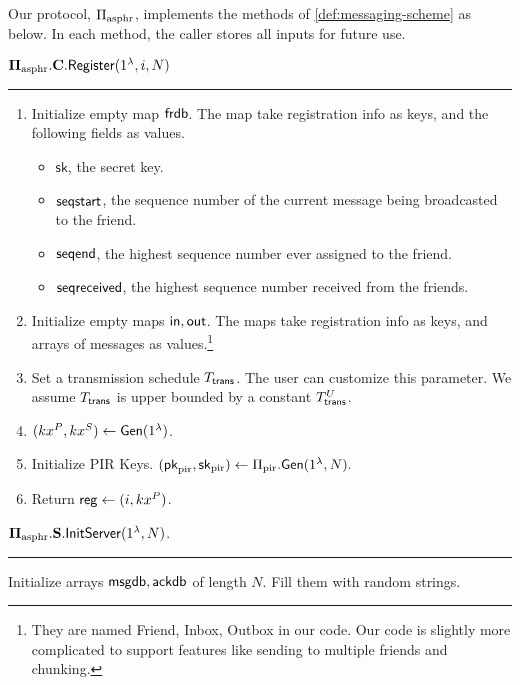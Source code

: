 \begin{definition}
Our protocol, $\Pi_{\text{asphr}}$, implements the methods of \cref{def:messaging-scheme} as below. In each method, the caller stores all inputs for future use.
\vspace{10pt}

$\mathbf{\Pi_{\text{asphr}}.C.\mathsf{Register}}(1^{\lambda}, i, N)$
\vspace{5pt}
\hrule
\vspace{5pt}
\begin{enumerate}
    \item Initialize empty map $\mathsf{frdb}$. The map take registration info as keys, and the following fields as values.
    \begin{itemize}
        \item $\mathsf{sk}$, the secret key.
        \item $\mathsf{seqstart}$, the sequence number of the current message being broadcasted to the friend.
        \item $\mathsf{seqend}$, the highest sequence number ever assigned to the friend.
        \item $\mathsf{seqreceived}$, the highest sequence number received from the friends.
    \end{itemize}
    \item Initialize empty maps $\mathsf{in}, \mathsf{out}$. The maps take registration info as keys, and arrays of messages as values.\footnote{They are named Friend, Inbox, Outbox in our code. Our code is slightly more complicated to support features like sending to multiple friends and chunking.}
    \item Set a transmission schedule $T_{\mathsf{trans}}$. The user can customize this parameter. We assume $T_{\mathsf{trans}}$ is upper bounded by a constant $T_{\mathsf{trans}}^U$.
    \item $(kx^P, kx^S) \leftarrow \mathsf{Gen}(1^{\lambda})$. 
    \item Initialize PIR Keys. $(\mathsf{pk}_{\text{pir}}, {\mathsf{sk}}_{\text{pir}}) \leftarrow \Pi_{\text{pir}}.\mathsf{Gen}(1^{\lambda}, N).$
    \item Return $\mathsf{reg} \leftarrow (i, kx^P)$.
\end{enumerate}
\vspace{10pt}
$\mathbf{\Pi_{\text{asphr}}.S.\mathsf{InitServer}}(1^{\lambda}, N)$.
\vspace{5pt}
\hrule
\vspace{5pt}
Initialize arrays $\mathsf{msgdb}, \mathsf{ackdb}$ of length $N$. Fill them with random strings.


\end{definition}
